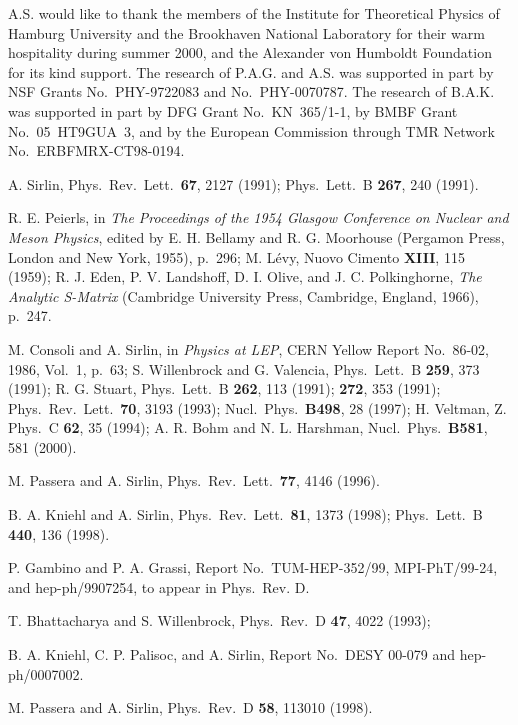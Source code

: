 \documentclass[a4paper,12pt]{article}
\begin{document}
A.S. would like to thank the members of the \coordHE{} Institute for
Theoretical Physics of Hamburg University and the Brookhaven National
Laboratory for their warm hospitality during summer 2000, and the Alexander
von Humboldt Foundation for its kind support.  
The research of P.A.G. and A.S. was supported in part by NSF Grants No.\
PHY-9722083 and No.\ PHY-0070787. 
The research of B.A.K. was supported in part by DFG Grant No.\ KN~365/1-1,
by BMBF Grant No.\ 05~HT9GUA~3, and by the European Commission through TMR
Network No.\ ERBFMRX-CT98-0194.

\begin{thebibliography}{99}

A. Sirlin, Phys.\ Rev.\ Lett.\ {\bf67}, 2127 (1991);
Phys.\ Lett.\ B {\bf267}, 240 (1991).
  
R. E. Peierls, in {\it The Proceedings of the 1954 Glasgow Conference on
Nuclear and Meson Physics}, edited by E. H. Bellamy and R. G. Moorhouse
(Pergamon Press, London and New York, 1955), p.~296;
M. L\'evy, Nuovo Cimento {\bf XIII}, 115 (1959); 
R. J. Eden, P. V. Landshoff, D. I. Olive, and J. C. Polkinghorne, {\it The
Analytic S-Matrix} (Cambridge University Press, Cambridge, England, 1966),
p.~247.

M. Consoli and A. Sirlin,
in {\it Physics at LEP}, CERN Yellow Report No.~86-02, 1986, Vol.~1, p.~63;
S. Willenbrock and G. Valencia, Phys.\ Lett.\ B {\bf259}, 373 (1991); 
R. G. Stuart, Phys.\ Lett.\ B {\bf262}, 113 (1991); {\bf272}, 353 (1991); 
Phys.\ Rev.\ Lett.\ {\bf70}, 3193 (1993);
Nucl.\ Phys.\ {\bf B498}, 28 (1997);
H. Veltman, Z. Phys.\ C {\bf62}, 35 (1994);
A. R. Bohm and N. L. Harshman, Nucl.\ Phys.\ {\bf B581}, 581 (2000).

M. Passera and A. Sirlin, Phys.\ Rev.\ Lett.\ {\bf77}, 4146 (1996).

B. A. Kniehl and A. Sirlin, Phys.\ Rev.\ Lett.\ {\bf81}, 1373 (1998);
Phys.\ Lett.\ B {\bf440}, 136 (1998).

P. Gambino and P. A. Grassi,
Report No.\ TUM-HEP-352/99, MPI-PhT/99-24, and hep-ph/9907254, to appear in 
Phys.\ Rev. D.

T. Bhattacharya and S. Willenbrock, Phys.\ Rev.\ D {\bf47}, 4022 (1993);

B. A. Kniehl, C. P. Palisoc, and A. Sirlin,
Report No.\ DESY 00-079 and hep-ph/0007002.

M. Passera and A. Sirlin,
Phys.\ Rev.\ D {\bf58}, 113010 (1998).


\end{thebibliography}
\end{document}

